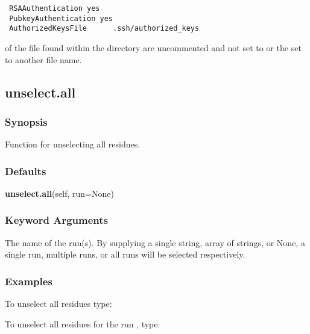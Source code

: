  {\footnotesize \begin{verbatim} 
 RSAAuthentication yes 
 PubkeyAuthentication yes 
 AuthorizedKeysFile      .ssh/authorized_keys 
 \end{verbatim}} 

 of the file  found within the directory  are uncommented and not set to  or the  set to another file name. 
  

  

 \newpage 

 \subsection{unselect.all} 

  
 \subsubsection{Synopsis} 

 Function for unselecting all residues. 
  

  
 \subsubsection{Defaults} 

 \textsf{\textbf{unselect.all}(self, run=None)} 

  
 \subsubsection{Keyword Arguments} 

   The name of the run(s).  By supplying a single string, array of strings, or None, a single run, multiple runs, or all runs will be selected respectively.  

  

  
 \subsubsection{Examples} 

 To unselect all residues type: 
  


 To unselect all residues for the run , type: 
  



